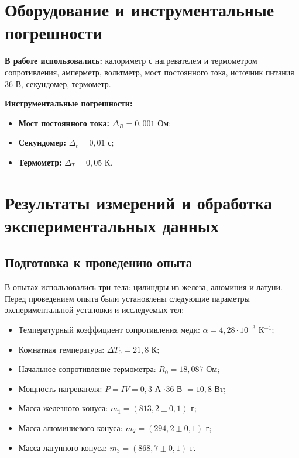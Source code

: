 \documentclass[a4paper,12pt]{article} %
\begin{document}
\section{Оборудование и инструментальные погрешности}

\textbf{В работе использовались:} калориметр с нагревателем и термометром сопротивления, амперметр, вольтметр, мост постоянного тока, источник питания 36 В, секундомер, термометр.

\textbf{Инструментальные погрешности:}

\begin{itemize}
    \item \textbf{Мост постоянного тока:} $\Delta_R = 0,001$ Ом;
    \item \textbf{Секундомер:} $\Delta_t = 0,01$ с;
    \item \textbf{Термометр:} $\Delta_T = 0,05$ К.
\end{itemize}

\section{Результаты измерений и обработка экспериментальных данных}

\subsection{Подготовка к проведению опыта}

В опытах использовались три тела: цилиндры из железа, алюминия и латуни. Перед проведением опыта были установлены следующие параметры экспериментальной установки и исследуемых тел:

\begin{itemize}
    \item Температурный коэффициент сопротивления меди: $\alpha = 4,28 \cdot 10^{-3}$ К$^{-1}$;
    \item Комнатная температура: $\Delta T_0 = 21,8$ К;
    \item Начальное сопротивление термометра: $R_0 = 18,087$ Ом;
    \item Мощность нагревателя: $P = IV = 0,3$ А $\cdot 36$ В $= 10,8$ Вт;
    \item Масса железного конуса: $m_1 = (813,2 \pm 0,1)$ г;
    \item Масса алюминиевого конуса: $m_2 = (294,2 \pm 0,1)$ г;
    \item Масса латунного конуса: $m_3 = (868,7 \pm 0,1)$ г.
\end{itemize}
\end{document}
